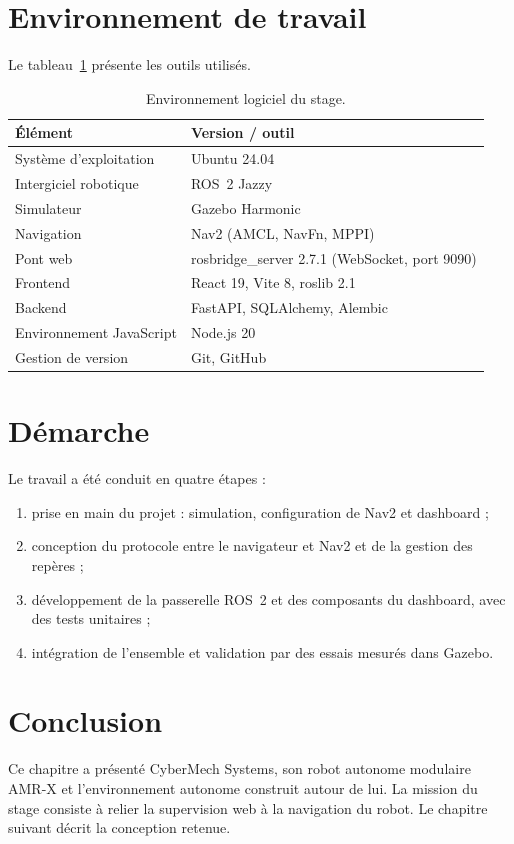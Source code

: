 \section{Environnement de travail}
Le tableau~\ref{tab:env} présente les outils utilisés.

\begin{table}[htbp]
\centering\small
\begin{tabular}{@{}ll@{}}
\toprule
\textbf{Élément} & \textbf{Version / outil} \\
\midrule
Système d'exploitation & Ubuntu 24.04 \\
Intergiciel robotique & ROS~2 Jazzy \\
Simulateur & Gazebo Harmonic \\
Navigation & Nav2 (AMCL, NavFn, MPPI) \\
Pont web & rosbridge\_server 2.7.1 (WebSocket, port 9090) \\
Frontend & React 19, Vite 8, roslib 2.1 \\
Backend & FastAPI, SQLAlchemy, Alembic \\
Environnement JavaScript & Node.js 20 \\
Gestion de version & Git, GitHub \\
\bottomrule
\end{tabular}
\caption{Environnement logiciel du stage.}
\label{tab:env}
\end{table}

\section{Démarche}
Le travail a été conduit en quatre étapes :
\begin{enumerate}
  \item prise en main du projet : simulation, configuration de Nav2 et dashboard ;
  \item conception du protocole entre le navigateur et Nav2 et de la gestion des repères ;
  \item développement de la passerelle ROS~2 et des composants du dashboard, avec des tests
    unitaires ;
  \item intégration de l'ensemble et validation par des essais mesurés dans Gazebo.
\end{enumerate}

\section*{Conclusion}
Ce chapitre a présenté CyberMech Systems, son robot autonome modulaire AMR-X et
l'environnement autonome construit autour de lui. La mission du stage consiste à relier
la supervision web à la navigation du robot. Le chapitre suivant décrit la conception
retenue.

